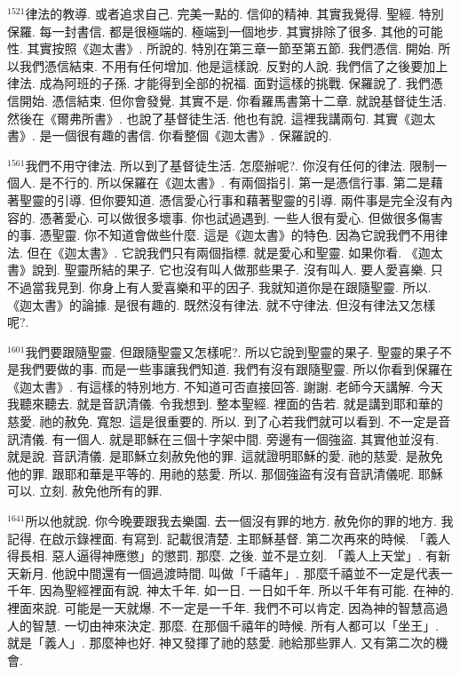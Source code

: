 \documentclass{book}
\begin{document}
$^{1521}$律法的教導.
或者追求自己.
完美一點的.
信仰的精神.
其實我覺得.
聖經.
特別保羅.
每一封書信.
都是很極端的.
極端到一個地步.
其實排除了很多.
其他的可能性.
其實按照《迦太書》.
所說的.
特別在第三章一節至第五節.
我們憑信.
開始.
所以我們憑信結束.
不用有任何增加.
他是這樣說.
反對的人說.
我們信了之後要加上律法.
成為阿班的子孫.
才能得到全部的祝福.
面對這樣的挑戰.
保羅說了.
我們憑信開始.
憑信結束.
但你會發覺.
其實不是.
你看羅馬書第十二章.
就說基督徒生活.
然後在《爾弗所書》.
也說了基督徒生活.
他也有說.
這裡我講兩句.
其實《迦太書》.
是一個很有趣的書信.
你看整個《迦太書》.
保羅說的.

$^{1561}$我們不用守律法.
所以到了基督徒生活.
怎麼辦呢?.
你沒有任何的律法.
限制一個人.
是不行的.
所以保羅在《迦太書》.
有兩個指引.
第一是憑信行事.
第二是藉著聖靈的引導.
但你要知道.
憑信愛心行事和藉著聖靈的引導.
兩件事是完全沒有內容的.
憑著愛心.
可以做很多壞事.
你也試過遇到.
一些人很有愛心.
但做很多傷害的事.
憑聖靈.
你不知道會做些什麼.
這是《迦太書》的特色.
因為它說我們不用律法.
但在《迦太書》.
它說我們只有兩個指標.
就是愛心和聖靈.
如果你看.
《迦太書》說到.
聖靈所結的果子.
它也沒有叫人做那些果子.
沒有叫人.
要人愛喜樂.
只不過當我見到.
你身上有人愛喜樂和平的因子.
我就知道你是在跟隨聖靈.
所以.
《迦太書》的論據.
是很有趣的.
既然沒有律法.
就不守律法.
但沒有律法又怎樣呢?.

$^{1601}$我們要跟隨聖靈.
但跟隨聖靈又怎樣呢?.
所以它說到聖靈的果子.
聖靈的果子不是我們要做的事.
而是一些事讓我們知道.
我們有沒有跟隨聖靈.
所以你看到保羅在《迦太書》.
有這樣的特別地方.
不知道可否直接回答.
謝謝.
老師今天講解.
今天我聽來聽去.
就是音訊清儀.
令我想到.
整本聖經.
裡面的告若.
就是講到耶和華的慈愛.
祂的赦免.
寬恕.
這是很重要的.
所以.
到了心若我們就可以看到.
不一定是音訊清儀.
有一個人.
就是耶穌在三個十字架中間.
旁邊有一個強盜.
其實他並沒有.
就是說.
音訊清儀.
是耶穌立刻赦免他的罪.
這就證明耶穌的愛.
祂的慈愛.
是赦免他的罪.
跟耶和華是平等的.
用祂的慈愛.
所以.
那個強盜有沒有音訊清儀呢.
耶穌可以.
立刻.
赦免他所有的罪.

$^{1641}$所以他就說.
你今晚要跟我去樂園.
去一個沒有罪的地方.
赦免你的罪的地方.
我記得.
在啟示錄裡面.
有寫到.
記載很清楚.
主耶穌基督.
第二次再來的時候.
「義人得長相.
惡人逼得神應懲」的懲罰.
那麼.
之後.
並不是立刻.
「義人上天堂」.
有新天新月.
他說中間還有一個過渡時間.
叫做「千禧年」.
那麼千禧並不一定是代表一千年.
因為聖經裡面有說.
神太千年.
如一日.
一日如千年.
所以千年有可能.
在神的.
裡面來說.
可能是一天就爆.
不一定是一千年.
我們不可以肯定.
因為神的智慧高過人的智慧.
一切由神來決定.
那麼.
在那個千禧年的時候.
所有人都可以「坐王」.
就是「義人」.
那麼神也好.
神又發揮了祂的慈愛.
祂給那些罪人.
又有第二次的機會.
\end{document}
